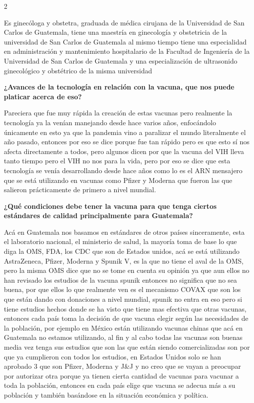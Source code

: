 \documentclass[12pt,spanish,Letterpaper,openany]{book}
\begin{document}
\begin {multicols}{2}

Es ginecóloga y obstetra, graduada de médica cirujana de la Universidad de San Carlos de
Guatemala, tiene una maestría en ginecología y obstetricia de la universidad de San Carlos
de Guatemala al mismo tiempo tiene una especialidad en administración y mantenimiento
hospitalario de la Facultad de Ingeniería de la Universidad de San Carlos de Guatemala y una
especialización de ultrasonido ginecológico y obstétrico de la misma universidad

\textbf{¿Avances de la tecnología en relación con la vacuna, que nos puede platicar acerca de eso?}

Pareciera que fue muy rápida la creación de estas vacunas pero realmente la tecnología ya la
venían manejando desde hace varios años, enfocándolo únicamente en esto ya que la
pandemia vino a paralizar el mundo literalmente el año pasado, entonces por eso se dice
porque fue tan rápido pero es que esto sí nos afecta directamente a todos, pero algunos dicen
por que la vacuna del VIH lleva tanto tiempo pero el VIH no nos para la vida, pero por eso
se dice que esta tecnología se venía desarrollando desde hace años como lo es el ARN
mensajero que se está utilizando en vacunas como Pfizer y Moderna que fueron las que
salieron prácticamente de primero a nivel mundial.

\textbf{¿Qué condiciones debe tener la vacuna para que tenga ciertos estándares de calidad principalmente para Guatemala?}

Acá en Guatemala nos basamos en estándares de otros países sinceramente, esta el
laboratorio nacional, el ministerio de salud, la mayoría toma de base lo que diga la OMS,
FDA, los CDC que son de Estados unidos, acá se está utilizando AstraZeneca, Pfizer,
Moderna y Spunik V, es la que no tiene el aval de la OMS, pero la misma OMS dice que no
se tome en cuenta su opinión ya que aun ellos no han revisado los estudios de la vacuna
spunik entonces no significa que no sea buena, por que ellos lo que realmente ven es el
mecanismo COVAX que son los que están dando con donaciones a nivel mundial, spunik no
entra en eso pero si tiene estudios hechos donde se ha visto que tiene mas efectiva que otras
vacunas, entonces cada país toma la decisión de que vacuna elegir según las necesidades de
la población, por ejemplo en México están utilizando vacunas chinas que acá en Guatemala
no estamos utilizando, al fin y al cabo todas las vacunas son buenas media vez tenga sus
estudios que son las que están siendo comercializadas son por que ya cumplieron con todos
los estudios, en Estados Unidos solo se han aprobado 3 que son Pfizer, Moderna y J\&J y no
creo que se vayan a preocupar por autorizar otra porque ya tienen cierta cantidad de vacunas
para vacunar a toda la población, entonces en cada país elige que vacuna se adecua más a su
población y también basándose en la situación económica y política.


\end{multicols}
\end{document}
